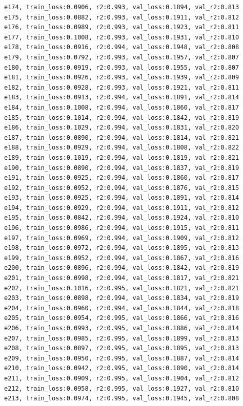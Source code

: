 \documentclass[a4paper, 12pt]{article}
\begin{document}
\begin{lstlisting}
e174, train_loss:0.0906, r2:0.993, val_loss:0.1894, val_r2:0.813
e175, train_loss:0.0882, r2:0.993, val_loss:0.1911, val_r2:0.812
e176, train_loss:0.0989, r2:0.993, val_loss:0.1923, val_r2:0.811
e177, train_loss:0.1008, r2:0.993, val_loss:0.1931, val_r2:0.810
e178, train_loss:0.0916, r2:0.994, val_loss:0.1948, val_r2:0.808
e179, train_loss:0.0792, r2:0.993, val_loss:0.1957, val_r2:0.807
e180, train_loss:0.0919, r2:0.993, val_loss:0.1955, val_r2:0.807
e181, train_loss:0.0926, r2:0.993, val_loss:0.1939, val_r2:0.809
e182, train_loss:0.0928, r2:0.993, val_loss:0.1921, val_r2:0.811
e183, train_loss:0.0913, r2:0.994, val_loss:0.1891, val_r2:0.814
e184, train_loss:0.1008, r2:0.994, val_loss:0.1860, val_r2:0.817
e185, train_loss:0.1014, r2:0.994, val_loss:0.1842, val_r2:0.819
e186, train_loss:0.1029, r2:0.994, val_loss:0.1831, val_r2:0.820
e187, train_loss:0.0890, r2:0.994, val_loss:0.1814, val_r2:0.821
e188, train_loss:0.0929, r2:0.994, val_loss:0.1808, val_r2:0.822
e189, train_loss:0.1019, r2:0.994, val_loss:0.1819, val_r2:0.821
e190, train_loss:0.0890, r2:0.994, val_loss:0.1837, val_r2:0.819
e191, train_loss:0.0925, r2:0.994, val_loss:0.1860, val_r2:0.817
e192, train_loss:0.0952, r2:0.994, val_loss:0.1876, val_r2:0.815
e193, train_loss:0.0925, r2:0.994, val_loss:0.1891, val_r2:0.814
e194, train_loss:0.0929, r2:0.994, val_loss:0.1911, val_r2:0.812
e195, train_loss:0.0842, r2:0.994, val_loss:0.1924, val_r2:0.810
e196, train_loss:0.0986, r2:0.994, val_loss:0.1915, val_r2:0.811
e197, train_loss:0.0969, r2:0.994, val_loss:0.1909, val_r2:0.812
e198, train_loss:0.0972, r2:0.994, val_loss:0.1895, val_r2:0.813
e199, train_loss:0.0952, r2:0.994, val_loss:0.1867, val_r2:0.816
e200, train_loss:0.0896, r2:0.994, val_loss:0.1842, val_r2:0.819
e201, train_loss:0.0998, r2:0.994, val_loss:0.1817, val_r2:0.821
e202, train_loss:0.1016, r2:0.995, val_loss:0.1821, val_r2:0.821
e203, train_loss:0.0898, r2:0.994, val_loss:0.1834, val_r2:0.819
e204, train_loss:0.0960, r2:0.994, val_loss:0.1844, val_r2:0.818
e205, train_loss:0.0954, r2:0.995, val_loss:0.1866, val_r2:0.816
e206, train_loss:0.0993, r2:0.995, val_loss:0.1886, val_r2:0.814
e207, train_loss:0.0985, r2:0.995, val_loss:0.1899, val_r2:0.813
e208, train_loss:0.0897, r2:0.995, val_loss:0.1895, val_r2:0.813
e209, train_loss:0.0950, r2:0.995, val_loss:0.1887, val_r2:0.814
e210, train_loss:0.0942, r2:0.995, val_loss:0.1890, val_r2:0.814
e211, train_loss:0.0909, r2:0.995, val_loss:0.1904, val_r2:0.812
e212, train_loss:0.0958, r2:0.995, val_loss:0.1927, val_r2:0.810
e213, train_loss:0.0974, r2:0.995, val_loss:0.1945, val_r2:0.808

\end{lstlisting}
\end{document}

